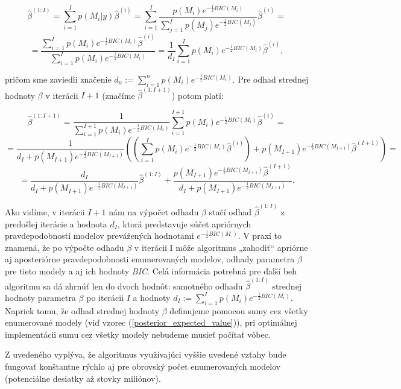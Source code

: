 \[
    \hat{\beta}^{(1:I)} = \sum_{i = 1}^{I} p(M_i | y) \hat{\beta}^{(i)} = \sum_{i = 1}^{I} \frac{p(M_i) e^{-\frac{1}{2}BIC(M_i)}}{\sum_{j = 1}^{I} p(M_j) e^{-\frac{1}{2}BIC(M_j)}} \hat{\beta}^{(i)} =
\]
\begin{equation} \label{appendix__expected_value}
    = \frac{\sum_{i = 1}^{I} p(M_i) e^{-\frac{1}{2}BIC(M_i)} \hat{\beta}^{(i)}}{\sum_{i = 1}^{I} p(M_i) e^{-\frac{1}{2}BIC(M_i)}} = \frac{1}{d_I} \sum_{i = 1}^{I} p(M_i) e^{-\frac{1}{2}BIC(M_i)} \hat{\beta}^{(i)},
\end{equation}

pričom sme zaviedli značenie \(d_n := \sum_{i = 1}^{n} p(M_i) e^{-\frac{1}{2}BIC(M_i)}\).
Pre odhad strednej hodnoty \(\beta\) v iterácii \(I + 1\) (značíme \(\hat{\beta}^{(1:I + 1)}\)) potom platí:

\[
    \hat{\beta}^{(1:I + 1)} = \frac{1}{\sum_{i = 1}^{I + 1} p(M_i) e^{-\frac{1}{2}BIC(M_i)}} \sum_{i = 1}^{I + 1} p(M_i) e^{-\frac{1}{2}BIC(M_i)} \hat{\beta}^{(i)} = 
\]
\[
    = \frac{1}{d_I + p(M_{I + 1}) e^{-\frac{1}{2}BIC(M_{I + 1})}} \left( \left( \sum_{i = 1}^{I} p(M_i) e^{-\frac{1}{2}BIC(M_i)} \hat{\beta}^{(i)} \right) + p(M_{I + 1}) e^{-\frac{1}{2}BIC(M_{I + 1})} \hat{\beta}^{(I+1)} \right) = 
\]
\[
    = \frac{d_I}{d_I + p(M_{I + 1}) e^{-\frac{1}{2}BIC(M_{I + 1})}} \hat{\beta}^{(1:I)} + \frac{p(M_{I + 1}) e^{-\frac{1}{2}BIC(M_{I + 1})} \hat{\beta}^{(I+1)}}{d_I + p(M_{I + 1}) e^{-\frac{1}{2}BIC(M_{I + 1})}}.
\]

Ako vidíme, v iterácii \(I + 1\) nám na výpočet odhadu \(\beta\) stačí odhad \(\hat{\beta}^{(1:I)}\) z predošlej iterácie a hodnota \(d_I\),
ktorá predstavuje súčet apriórnych pravdepodobností modelov prevážených hodnotami \(e^{-\frac{1}{2}BIC(M_{.})}\).
V praxi to znamená, že po výpočte odhadu \(\beta\) v iterácii I môže algoritmus „zahodiť“ apriórne aj aposteriórne pravdepodobnosti enumerovaných modelov,
odhady parametra \(\beta\) pre tieto modely a aj ich hodnoty \emph{BIC}.
Celá informácia potrebná pre ďalší beh algoritmu sa dá zhrnúť len do dvoch hodnôt:
samotného odhadu \(\hat{\beta}^{(1:I)}\) strednej hodnoty parametra \(\beta\) po iterácii \(I\) a hodnoty \(d_I := \sum_{i = 1}^{I} p(M_i) e^{-\frac{1}{2}BIC(M_i)}\).
Napriek tomu, že odhad strednej hodnoty \(\beta\) definujeme pomocou sumy cez všetky enumerované modely (viď vzorec (\ref{posterior_expected_value})),
pri optimálnej implementácii sumu cez všetky modely nebudeme musieť počítať vôbec.

Z uvedeného vyplýva, že algoritmus využívajúci vyššie uvedené vzťahy bude fungovať konštantne rýchlo aj pre obrovský počet enumerovaných modelov (potenciálne desiatky až stovky miliónov).

